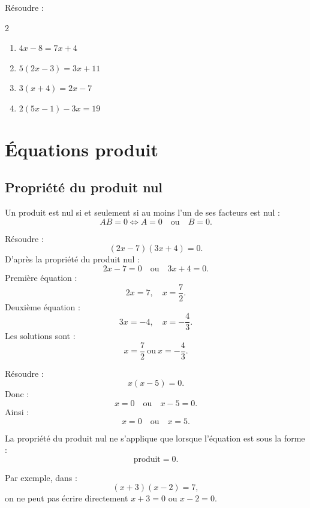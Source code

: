 \documentclass[11pt,a4paper]{article}
\newcounter{exercice}
\newcommand{\encadre}[1]{\boxed{\displaystyle #1}}
\begin{document}
\begin{exercice}[Méthode]
Résoudre :
\begin{multicols}{2}
\begin{enumerate}[label=\alph*)]
  \item $4x-8=7x+4$
  \item $5(2x-3)=3x+11$
  \item $3(x+4)=2x-7$
  \item $2(5x-1)-3x=19$
\end{enumerate}
\end{multicols}
\end{exercice}

\newpage

\section{Équations produit}

\subsection{Propriété du produit nul}

\begin{propriete}
Un produit est nul si et seulement si au moins l'un de ses facteurs est nul :
\[
AB=0
\Longleftrightarrow
A=0 \quad \text{ou} \quad B=0.
\]
\end{propriete}

\begin{exemple}
Résoudre :
\[
(2x-7)(3x+4)=0.
\]
D'après la propriété du produit nul :
\[
2x-7=0
\quad \text{ou} \quad
3x+4=0.
\]
Première équation :
\[
2x=7,
\quad
x=\frac{7}{2}.
\]
Deuxième équation :
\[
3x=-4,
\quad
x=-\frac{4}{3}.
\]
Les solutions sont :
\[
\encadre{x=\frac{7}{2}\ \text{ou}\ x=-\frac{4}{3}}.
\]
\end{exemple}

\begin{exemple}
Résoudre :
\[
x(x-5)=0.
\]
Donc :
\[
x=0
\quad \text{ou} \quad
x-5=0.
\]
Ainsi :
\[
x=0
\quad \text{ou} \quad
x=5.
\]
\end{exemple}

\begin{attention}
La propriété du produit nul ne s'applique que lorsque l'équation est sous la forme :
\[
\text{produit}=0.
\]

Par exemple, dans :
\[
(x+3)(x-2)=7,
\]
on ne peut pas écrire directement $x+3=0$ ou $x-2=0$.
\end{attention}
\end{document}
